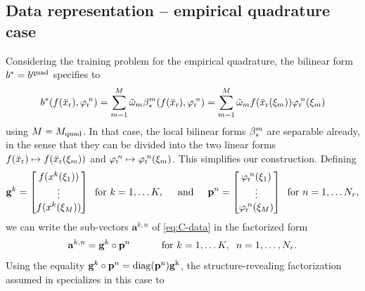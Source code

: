 \documentclass[onefignum,onetabnum]{siamart251104}
\newcommand{\bv}[1]{{\mathbf #1}}
\newcommand{\rom}[1]{{{#1}_{\rm{r}}}}
\newcommand{\Nr}{{N_r}}
\newcommand{\bform}{{b}}
\newcommand{\tL}{{\fs{\varphi}}}
\newcommand{\tAlg}{{\bv{p}}}
\newcommand{\fs}[1]{{{#1}}} %
\newcommand{\wei}{{\omega}} %
\newcommand{\xp}{{\xi}} %
\newcommand{\vAp}{\bv{a}}
\newcommand{\xrf}{{\rom{\bar{x}}}}
\newcommand{\mydiag}{\rm{diag}}
\begin{document}
\subsection{Data representation -- empirical quadrature case} \label{subsec:separatedData-quad}
Considering the training problem for the empirical quadrature, the bilinear form $\bform^{\rm{*}} = \bform^{\rm{quad}}$ specifies to
\begin{align*}
\bform^{\rm{*}}(f(\xrf),\rom{\tL}\!^n) = \sum_{m=1}^{M} \tilde{\wei}_m \beta_{\rm{*}}^m(f(\xrf),\rom{\tL}\!^n)= \sum_{m=1}^{M} \tilde{\wei}_m {f} (\xrf({\xp}_m))\rom{\tL}\!^n({\xp}_m) 
\end{align*}
using $M = M_{\rm{quad}}$. In that case, the local bilinear forms $\beta_{\rm{*}}^m$ are separable already, in the sense that they can be divided into the two linear forms $f(\xrf) \mapsto f(\xrf({\xp}_m))$ and $\rom{\tL}\!^n \mapsto \rom{\tL}\!^n({\xp}_m)$. This simplifies our construction. Defining
{\small
\begin{align*}
	\bv{g}^k = 
	\begin{bmatrix}
			{f}(\fs{x}^k({\xp}_1)) \\
			\vdots \\
			{f}(\fs{x}^k({\xp}_{M}))
	\end{bmatrix}
\hspace{0.2cm} \text{for } k=1,\ldots K, \hspace{0.5cm} \text{and} \hspace{0.5cm}
	\tAlg^n = 
	\begin{bmatrix}
			\rom{\tL}\!^n({\xp}_1) \\
			\vdots \\
			\rom{\tL}\!^n({\xp}_M)
	\end{bmatrix}
	\hspace{0.2cm} \text{for } n=1,\ldots \Nr,
\end{align*}
}%
we can write the sub-vectors $\vAp^{k,n}$ of \eqref{eq:C-data} in the factorized form
\begin{align*}
	\vAp^{k,n} = \bv{g}^k \circ \tAlg^n  \hspace{1cm} \text{ for } k= 1,\ldots K, \hspace{0.2cm} n=1,\ldots, \Nr.
\end{align*}
Using the equality $\bv{g}^k \circ \tAlg^n = \mydiag(\tAlg^n) \bv{g}^k$, the structure-revealing factorization assumed in  specializes in this case to
\end{document}
